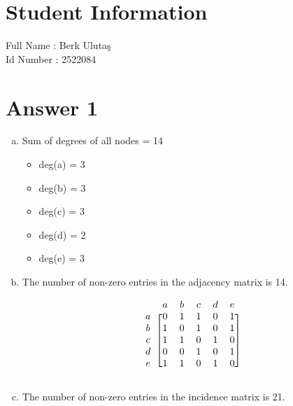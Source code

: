 \documentclass[12pt]{article}
\begin{document}
\section*{Student Information } 
Full Name :  Berk Ulutaş \\
Id Number :  2522084 \\

\section*{Answer 1}
\begin{enumerate} [a)]
    \item Sum of degrees of all nodes = 14
    \begin{itemize}
        \item deg(a) = 3
        \item deg(b) = 3
        \item deg(c) = 3
        \item deg(d) = 2
        \item deg(e) = 3
    \end{itemize}
    \item The number of non-zero entries in the adjacency matrix is 14.
    

    \[
    \begin{blockarray}{cccccc}
     & a & b & c & d & e \\
    \begin{block}{c[ccccc]}
      a & 0 & 1 & 1 & 0 & 1  \\
      b & 1 & 0 & 1 & 0 & 1 \\
      c & 1 & 1 & 0 & 1 & 0 \\
      d & 0 & 0 & 1 & 0 & 1 \\
      e & 1 & 1 & 0 & 1 & 0 \\
    \end{block}
    \end{blockarray}
     \]

    \item The number of non-zero entries in the incidence matrix is 21.
    \begin{figure}[H]
    	\centering
\end{figure}
\end{enumerate}
\end{document}
